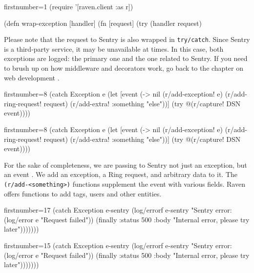 \begin{clojure/lines*}{firstnumber=1}
(require '[raven.client :as r])

(defn wrap-exception
  [handler]
  (fn [request]
    (try
      (handler request)
\end{clojure/lines*}

Please note that the request to Sentry is also wrapped in \verb|try/catch|. Since Sentry is a third-party service, it may be unavailable at times. In this case, both exceptions are logged: the primary one and the one related to Sentry.
If you need to brush up on how middleware and decorators work, go back to the chapter on web development .

\ifx\DEVICETYPE\MOBILE

\begin{clojure/lines*}{firstnumber=8}
(catch Exception e
  (let [event
        (-> nil
            (r/add-exception! e)
            (r/add-ring-request!
              request)
            (r/add-extra!
              {:something "else"}))]
    (try @(r/capture! DSN event))))
\end{clojure/lines*}

\else

\begin{clojure/lines*}{firstnumber=8}
      (catch Exception e
        (let [event (-> nil
                        (r/add-exception! e)
                        (r/add-ring-request! request)
                        (r/add-extra! {:something "else"}))]
          (try
            @(r/capture! DSN event))))
\end{clojure/lines*}

\fi

For the sake of completeness, we are passing to Sentry not just an exception, but an event . We add an exception, a Ring request, and arbitrary data to it. The \verb|(r/add-<something>)| functions supplement the event with various fields. Raven offers functions to add tags, users and other entities.

\ifx\DEVICETYPE\MOBILE

\begin{clojure/lines*}{firstnumber=17}
(catch Exception e-sentry
  (log/errorf e-sentry
    "Sentry error: %
  (log/error e "Request failed"))
(finally
  {:status 500
   :body  "Internal error, please try
   later"})))))))
\end{clojure/lines*}

\else

\begin{clojure/lines*}{firstnumber=15}
            (catch Exception e-sentry
              (log/errorf e-sentry "Sentry error: %
              (log/error e "Request failed"))
            (finally
              {:status 500
               :body "Internal error, please try later"})))))))
\end{clojure/lines*}

